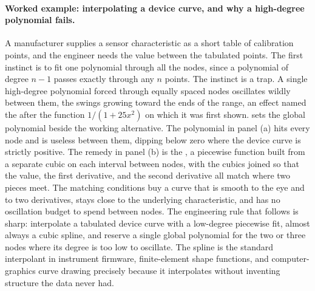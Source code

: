 \paragraph{Worked example: interpolating a device curve, and why a
high-degree polynomial fails.}
A manufacturer supplies a sensor characteristic as a short table of
calibration points, and the engineer needs the value between the
tabulated points. The first instinct is to fit one polynomial through
all the nodes, since a polynomial of degree $n - 1$ passes exactly
through any $n$ points. The instinct is a trap. A single high-degree
polynomial forced through equally spaced nodes oscillates wildly
between them, the swings growing toward the ends of the range, an
effect named the  after the function
$1/(1 + 25x^{2})$ on which it was first shown.
 sets the global polynomial
beside the working alternative. The polynomial in panel (a) hits every
node and is useless between them, dipping below zero where the device
curve is strictly positive. The remedy in panel (b) is the
, a piecewise function built from a separate
cubic on each interval between nodes, with the cubics joined so that
the value, the first derivative, and the second derivative all match
where two pieces meet. The matching conditions buy a curve that is
smooth to the eye and to two derivatives, stays close to the
underlying characteristic, and has no oscillation budget to spend
between nodes. The engineering rule that follows is sharp: interpolate
a tabulated device curve with a low-degree piecewise fit, almost
always a cubic spline, and reserve a single global polynomial for the
two or three nodes where its degree is too low to oscillate. The
spline is the standard interpolant in instrument firmware,
finite-element shape functions, and computer-graphics curve drawing
precisely because it interpolates without inventing structure the data
never had.



